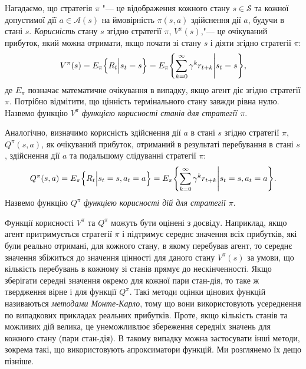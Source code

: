 \documentclass[a4paper,10pt,fleqn]{article}
\begin{document}
Нагадаємо, що стратегія $\pi$ "--- це відображення кожного стану $s \in \mathcal{S}$ та кожної допустимої дії $a \in \mathcal{A}(s)$ на ймовірність $\pi(s,a)$ здійснення дії $a$, будучи в стані $s$. \emph{Корисність} стану $s$ згідно стратегії $\pi$, $V^\pi(s)$,"--- це очікуваний прибуток, який можна отримати, якщо почати зі стану $s$ і діяти згідно стратегії $\pi$:
\begin{equation}
V^\pi(s) = E_\pi \Bigl\{ R_t \Big| s_t = s \Bigr \} = E_\pi \Biggl\{\sum_{k=0}^{\infty}\gamma^k r_{t+k} \Bigg| s_t=s \Biggr\},
\end{equation}
де $E_\pi{}$ позначає математичне очікування в випадку, якщо агент діє згідно стратегії $\pi$. Потрібно відмітити, що цінність термінального стану завжди рівна нулю. Назвемо функцію $V^\pi$ \emph{функцією корисності станів для стратегії $\pi$}.

Аналогічно, визначимо корисність здійснення дії $a$ в стані $s$ згідно стратегії $\pi$, $Q^\pi(s,a)$, як очікуваний прибуток, отриманий в результаті перебування в стані $s$, здійснення дії $a$ та подальшому слідуванні стратегії $\pi$:
\begin{equation}
Q^\pi(s,a)=E_\pi \Bigl\{ R_t \Big| s_t=s, a_t=a \Bigr\} = E_\pi \Biggl\{\sum_{k=0}^{\infty}\gamma^k r_{t+k} \Bigg| s_t=s,a_t=a \Biggr\}.
\end{equation}
Назвемо функцію $Q^\pi$ \emph{функцією корисності дій для стратегії $\pi$}.

Функції корисності $V^\pi$ та $Q^\pi$ можуть бути оцінені з досвіду. Наприклад, якщо агент притримується стратегії $\pi$ і підтримує середнє значення всіх прибутків, які були реально отримані, для кожного стану, в якому перебував агент, то середнє значення збіжиться до значення цінності для даного стану $V^\pi(s)$ за умови, що кількість перебувань в кожному зі станів прямує до нескінченності. Якщо зберігати середні значення окремо для кожної пари стан-дія, то таке ж твердження вірне і для функції $Q^\pi$. Такі методи оцінки цінових функцій називаються \emph{методами Монте-Карло}, тому що вони використовують усереднення по випадкових прикладах реальних прибутків. Проте, якщо кількість станів та можливих дій велика, це унеможливлює збереження середніх значень для кожного стану (пари стан-дія). В такому випадку можна застосувати інші методи, зокрема такі, що використовують апроксиматори функцій. Ми розглянемо їх дещо пізніше.
\end{document}

